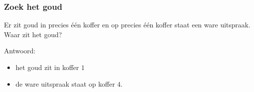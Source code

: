 \documentclass[13pt]{beamer}
\begin{document}
\begin{frame}
  \frametitle{Zoek het goud}
  Er zit goud in precies één koffer en op precies één koffer staat een
  ware uitspraak. Waar zit het goud?
  \vfill
  \begin{changemargin}{-1.cm}{-0.5cm}
    \begin{multicols}{4}
      \begin{center}
      \end{center}
    \end{multicols}
  \end{changemargin}
  \vfill
  Antwoord:
  \begin{itemize}
  \item<2-> het goud zit in koffer $1$
  \item<3-> de ware uitspraak staat op koffer $4$.
  \end{itemize}
\end{frame}
\end{document}
